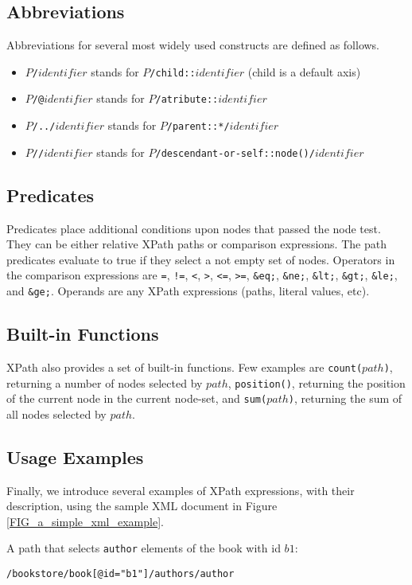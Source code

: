 \subsection{Abbreviations}
Abbreviations for several most widely used constructs are defined as follows.
\begin{itemize}
\item \texttt{$P$/$identifier$} stands for \texttt{$P$/child::$identifier$} (child is a default axis)
\item \texttt{$P$/@$identifier$} stands for \texttt{$P$/atribute::$identifier$}
\item \texttt{$P$/../$identifier$} stands for \texttt{$P$/parent::*/$identifier$}
\item \texttt{$P$//$identifier$} stands for \texttt{$P$/descendant-or-self::node()/$identifier$} 
\end{itemize}

\subsection{Predicates}
Predicates place additional conditions upon nodes that passed the node test. They can be either relative XPath paths or comparison expressions. The path predicates evaluate to true if they select a not empty set of nodes. Operators in the comparison expressions are \texttt{=}, \texttt{!=}, \texttt{<}, \texttt{>}, \texttt{<=}, \texttt{>=}, \texttt{\&eq;}, \texttt{\&ne;}, \texttt{\&lt;}, \texttt{\&gt;}, \texttt{\&le;}, and \texttt{\&ge;}. Operands are any XPath expressions (paths, literal values, etc).

\subsection{Built-in Functions}
XPath also provides a set of built-in functions. Few examples are \texttt{count($path$)}, returning a number of nodes selected by $path$, \texttt{position()}, returning the position of the current node in the current node-set, and \texttt{sum($path$)}, returning the sum of all nodes selected by $path$.

\subsection{Usage Examples}
Finally, we introduce several examples of XPath expressions, with their description, using the sample XML document in Figure \ref{FIG_a_simple_xml_example}.

A path that selects \texttt{author} elements of the book with id $b1$:
\begin{alltt}
/bookstore/book[@id = "b1"]/authors/author
\end{alltt}


